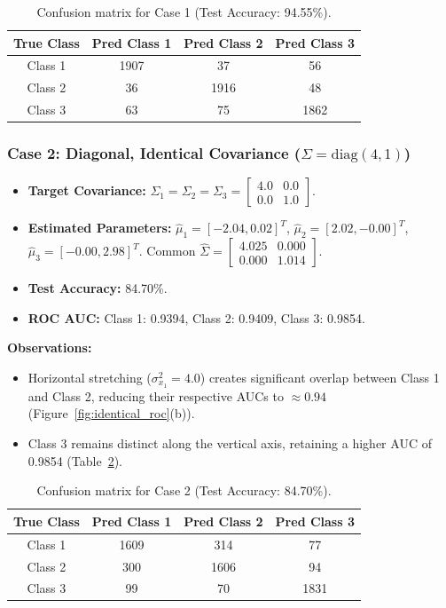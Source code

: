 \documentclass[11pt,a4paper]{article}
\begin{document}
\begin{table}[ht]
\centering
\begin{tabular}{cccc}
\toprule
\textbf{True Class} & \textbf{Pred Class 1} & \textbf{Pred Class 2} & \textbf{Pred Class 3}\\
\midrule
Class 1 & 1907 & 37 & 56\\
Class 2 & 36 & 1916 & 48\\
Class 3 & 63 & 75 & 1862\\
\bottomrule
\end{tabular}
\caption{Confusion matrix for Case 1 (Test Accuracy: 94.55\%).}
\label{tab:c1}
\end{table}

\subsubsection{Case 2: Diagonal, Identical Covariance ($\Sigma=\mathrm{diag}(4,1)$)}
\begin{itemize}
  \item \textbf{Target Covariance:} $\Sigma_1=\Sigma_2=\Sigma_3=\begin{bmatrix}4.0&0.0\\0.0&1.0\end{bmatrix}$.
  \item \textbf{Estimated Parameters:} $\hat{\mu}_1=[-2.04,0.02]^T$, $\hat{\mu}_2=[2.02,-0.00]^T$, $\hat{\mu}_3=[-0.00,2.98]^T$. Common $\hat{\Sigma}=\begin{bmatrix}4.025&0.000\\0.000&1.014\end{bmatrix}$.
  \item \textbf{Test Accuracy:} 84.70\%.
  \item \textbf{ROC AUC:} Class 1: 0.9394, Class 2: 0.9409, Class 3: 0.9854.
\end{itemize}
\textbf{Observations:}
\begin{itemize}
  \item Horizontal stretching ($\sigma_{x_1}^2=4.0$) creates significant overlap between Class 1 and Class 2, reducing their respective AUCs to $\approx 0.94$ (Figure~\ref{fig:identical_roc}(b)).
  \item Class 3 remains distinct along the vertical axis, retaining a higher AUC of 0.9854 (Table~\ref{tab:c2}).
\end{itemize}

\begin{table}[ht]
\centering
\begin{tabular}{cccc}
\toprule
\textbf{True Class} & \textbf{Pred Class 1} & \textbf{Pred Class 2} & \textbf{Pred Class 3}\\
\midrule
Class 1 & 1609 & 314 & 77\\
Class 2 & 300 & 1606 & 94\\
Class 3 & 99 & 70 & 1831\\
\bottomrule
\end{tabular}
\caption{Confusion matrix for Case 2 (Test Accuracy: 84.70\%).}
\label{tab:c2}
\end{table}
\end{document}
